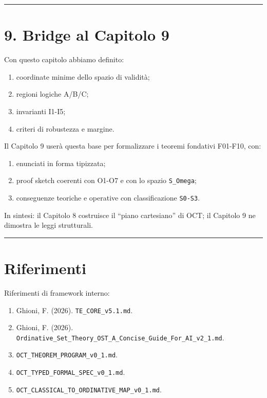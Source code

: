 \begin{center}\rule{0.5\linewidth}{0.5pt}\end{center}

\section{9. Bridge al Capitolo 9}

Con questo capitolo abbiamo definito:

\begin{enumerate}
\def\labelenumi{\arabic{enumi}.}
\tightlist
\item
  coordinate minime dello spazio di validità;
\item
  regioni logiche A/B/C;
\item
  invarianti I1-I5;
\item
  criteri di robustezza e margine.
\end{enumerate}

Il Capitolo 9 userà questa base per formalizzare i teoremi fondativi F01-F10, con:

\begin{enumerate}
\def\labelenumi{\arabic{enumi}.}
\tightlist
\item
  enunciati in forma tipizzata;
\item
  proof sketch coerenti con O1-O7 e con lo spazio \texttt{S\_Omega};
\item
  conseguenze teoriche e operative con classificazione \texttt{S0-S3}.
\end{enumerate}

In sintesi: il Capitolo 8 costruisce il ``piano cartesiano'' di OCT; il Capitolo 9 ne dimostra le leggi strutturali.

\begin{center}\rule{0.5\linewidth}{0.5pt}\end{center}

\section{Riferimenti}

Riferimenti di framework interno:

\begin{enumerate}
\def\labelenumi{\arabic{enumi}.}
\tightlist
\item
  Ghioni, F. (2026). \texttt{TE\_CORE\_v5.1.md}.
\item
  Ghioni, F. (2026). \texttt{Ordinative\_Set\_Theory\_OST\_A\_Concise\_Guide\_For\_AI\_v2\_1.md}.
\item
  \texttt{OCT\_THEOREM\_PROGRAM\_v0\_1.md}.
\item
  \texttt{OCT\_TYPED\_FORMAL\_SPEC\_v0\_1.md}.
\item
  \texttt{OCT\_CLASSICAL\_TO\_ORDINATIVE\_MAP\_v0\_1.md}.
\end{enumerate}

